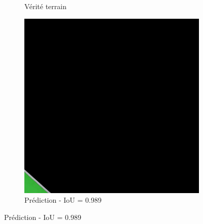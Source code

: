 \begin{figure}[H]
\begin{subfigure}{0.32\textwidth}
    \caption{Vérité terrain}
\end{subfigure}
\hfill
\begin{subfigure}{0.32\textwidth}
    \includegraphics[width=\textwidth]{02-main//figures/ch4/kfold_ensembles/segformer_tu-regnety_080.ra3_in1k/best_cases/best_4_iou0.989_24941121_tile_16_8_fd3555_overlay_pred.png}
    \caption{Prédiction - IoU = 0.989}
\end{subfigure}

\vspace{0.35cm}


\end{figure}
